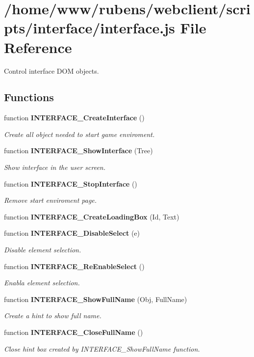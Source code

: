 \section{/home/www/rubens/webclient/scripts/interface/interface.js File Reference}
\label{interface_8js}
Control interface DOM objects. 

\subsection*{Functions}
\begin{CompactItemize}
\item 
function {\bf INTERFACE\_\-CreateInterface} ()
\begin{CompactList}\small\item\em Create all object needed to start game enviroment. \item\end{CompactList}\item 
function {\bf INTERFACE\_\-ShowInterface} (Tree)
\begin{CompactList}\small\item\em Show interface in the user screen. \item\end{CompactList}\item 
function {\bf INTERFACE\_\-StopInterface} ()
\begin{CompactList}\small\item\em Remove start enviroment page. \item\end{CompactList}\item 
function {\bf INTERFACE\_\-CreateLoadingBox} (Id, Text)
\item 
function {\bf INTERFACE\_\-DisableSelect} (e)
\begin{CompactList}\small\item\em Disable element selection. \item\end{CompactList}\item 
function {\bf INTERFACE\_\-ReEnableSelect} ()
\begin{CompactList}\small\item\em Enabla element selection. \item\end{CompactList}\item 
function {\bf INTERFACE\_\-ShowFullName} (Obj, FullName)
\begin{CompactList}\small\item\em Create a hint to show full name. \item\end{CompactList}\item 
function {\bf INTERFACE\_\-CloseFullName} ()
\begin{CompactList}\small\item\em Close hint box created by INTERFACE\_\-ShowFullName function. \item\end{CompactList}\end{CompactItemize}


